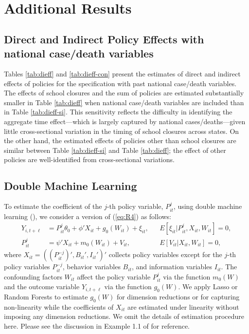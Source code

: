 \documentclass[3p, longtitle]{elsarticle}
\theoremstyle{definition}
\begin{document}
\FloatBarrier

\section{Additional Results}

\subsection{Direct and Indirect Policy Effects with national case/death variables}
Tables \ref{tab:dieff} and \ref{tab:dieff-con}  present  the estimates of direct and indirect effects of policies for the specification with past national case/death variables. The effects of school closures and  the sum of policies are estimated substantially smaller in Table \ref{tab:dieff} when national case/death variables are included than in Table \ref{tab:dieff-si}. This sensitivity reflects the difficulty in identifying the aggregate time effect---which is largely captured by national cases/deaths---given little cross-sectional variation in the timing of school closures across states. On the other hand, the estimated effects of policies other than school closures are similar between Table \ref{tab:dieff-si} and Table \ref{tab:dieff}; the effect of other policies are well-identified from cross-sectional variations.



\subsection{Double Machine Learning}


To estimate the coefficient of the $j$-th policy variable, $P_{it}^j$, using double machine learning (\cite{chernozhukov18}), we consider a version of (\ref{eq:R4}) as follows:
\begin{align*}
Y_{i,t+\ell} & = P_{it}^j \theta_0 + \phi' X_{it} + g_0(W_{it}) + \xi_{it}, && E[\xi_{it}|P_{it}^j,X_{it},W_{it}]=0,\\
P_{it}^j &= \psi' X_{it} +m_0(W_{it}) +V_{it},&& E[V_{it}|X_{it},W_{it}]=0,
\end{align*}
where $X_{it}=((P_{it}^{-j})',B_{it}',I_{it}')'$ collects  policy variables except for the $j$-th policy variables $P_{it}^{-j}$, behavior variables $B_{it}$, and information variables $I_{it}$. The confounding factors $W_{it}$ affect the policy variable $P_{it}^j$ via the function $m_0(W)$ and the outcome variable $Y_{i,t+\ell}$ via the function $g_0(W)$. We apply Lasso  or  Random Forests to estimate $g_0(W)$  for dimension reductions or for capturing non-linearity while the coefficients of $X_{it}$ are estimated under linearity without imposing any dimension reductions.  We omit the details of estimation procedure here. Please see the discussion in Example 1.1 of  \cite{chernozhukov18} for reference.
\end{document}
